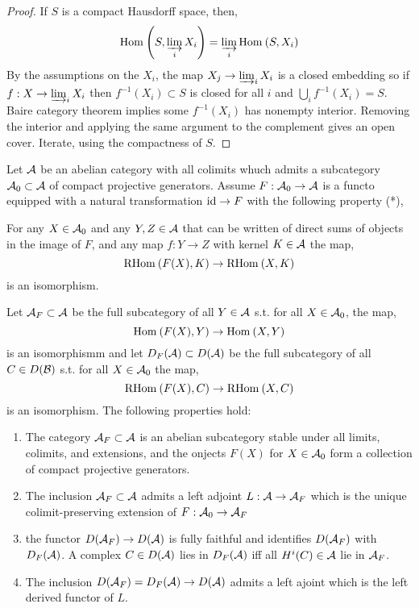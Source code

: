\documentclass[12pt]{article}
\begin{document}
\begin{proof}
If $S$ is a compact Hausdorff space, then,
\[ \mathrm{Hom}_{} \left( S, \operatorname*{\varinjlim}_i X_i \right) = \operatorname*{\varinjlim}_i \mathrm{Hom}_{} \left( S, X_i \right) \]
By the assumptions on the $X_i$, the map $X_j \to \operatorname*{\varinjlim}_i X_i$ is a closed embedding so if $f : X \to \operatorname*{\varinjlim}_i X_i$ then $f^{-1}(X_i) \subset S$ is closed for all $i$ and $\bigcup_i f^{-1}(X_i) = S$. Baire category theorem implies some $f^{-1}(X_i)$ has nonempty interior. Removing the interior and applying the same argument to the complement gives an open cover. Iterate, using the compactness of $S$. 
\end{proof}

\begin{lemma}
Let $\mathcal{A}$ be an abelian category with all colimits whuch admits a subcategory $\mathcal{A}_0 \subset \mathcal{A}$ of compact projective generators. Assume $F : \mathcal{A}_0 \to \mathcal{A}$ is a functo equipped with a natural transformation $\mathrm{id} \to F$ with the following property (*),
\begin{center}
For any $X \in \mathcal{A}_0$ and any $Y,Z \in \mathcal{A}$ that can be written of direct sums of objects in the image of $F$, and any map $f : Y \to Z$ with kernel $K \in \mathcal{A}$ the map,
\[ \mathrm{RHom}_{} \left( F(X), K \right) \to \mathrm{RHom}_{} \left( X, K \right) \]
is an isomorphism.
\end{center}
Let $\mathcal{A}_F \subset \mathcal{A}$ be the full subcategory of all $Y \in \mathcal{A}$ s.t. for all $X \in \mathcal{A}_0$, the map,
\[ \mathrm{Hom}_{} \left( F(X), Y \right) \to \mathrm{Hom}_{} \left( X, Y \right) \]
is an isomorphismm and let $D_F(\mathcal{A}) \subset D(\mathcal{A})$ be the full subcategory of all $C \in D(\mathcal{B})$ s.t. for all $X \in \mathcal{A}_0$ the map,
\[ \mathrm{RHom}_{} \left( F(X), C \right) \to \mathrm{RHom}_{} \left( X, C \right) \]
is an isomorphism. The following properties hold:
\begin{enumerate}
\item The category $\mathcal{A}_F \subset \mathcal{A}$ is an abelian subcategory stable under all limits, colimits, and extensions, and the onjects $F(X)$ for $X \in \mathcal{A}_0$ form a collection of compact projective generators.

\item The inclusion $\mathcal{A}_F \subset \mathcal{A}$ admits a left adjoint $L : \mathcal{A} \to \mathcal{A}_F$ which is the unique colimit-preserving extension of $F : \mathcal{A}_0 \to \mathcal{A}_F$

\item the functor $D(\mathcal{A}_F) \to D(\mathcal{A})$ is fully faithful and identifies $D(\mathcal{A}_F)$ with $D_F(\mathcal{A})$. A complex $C \in D(\mathcal{A})$ lies in $D_F(\mathcal{A})$ iff all $H^i(C) \in \mathcal{A}$ lie in $\mathcal{A}_F$. 

\item The inclusion $D(\mathcal{A}_F) = D_F(\mathcal{A}) \to D(\mathcal{A})$ admits a left ajoint which is the left derived functor of $L$.
\end{enumerate}
\end{lemma}
\end{document}
